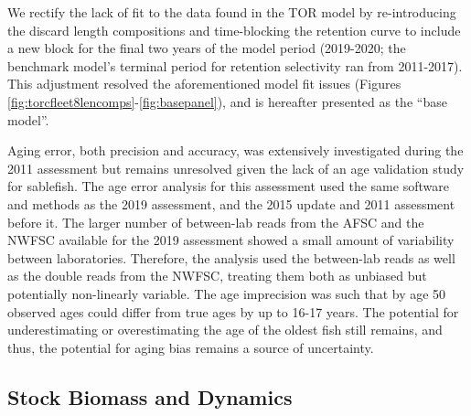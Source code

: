 \documentclass[11pt,
  english,
  a4paper,
]{article}
\begin{document}
\leavevmode\tagmcend\tagstructend\par


We rectify the lack of fit to the data found in the TOR model by re-introducing the discard length compositions and time-blocking the retention curve to include a new block for the final two years of the model period (2019-2020; the benchmark model's terminal period for retention selectivity ran from 2011-2017). This adjustment resolved the aforementioned model fit issues (Figures \ref{fig:torcfleet8lencomps}-\ref{fig:basepanel}), and is hereafter presented as the ``base model''.

\leavevmode\tagmcend\tagstructend\par


Aging error, both precision and accuracy, was extensively investigated during the 2011 assessment but remains unresolved given the lack of an age validation study for sablefish. The age error analysis for this assessment used the same software and methods as the 2019 assessment, and the 2015 update and 2011 assessment before it. The larger number of between-lab reads from the AFSC and the NWFSC available for the 2019 assessment showed a small amount of variability between laboratories. Therefore, the analysis used the between-lab reads as well as the double reads from the NWFSC, treating them both as unbiased but potentially non-linearly variable. The age imprecision was such that by age 50 observed ages could differ from true ages by up to 16-17 years. The potential for underestimating or overestimating the age of the oldest fish still remains, and thus, the potential for aging bias remains a source of uncertainty.

\leavevmode\tagmcend\tagstructend\par


\hypertarget{stock-biomass-and-dynamics}{%
\subsection*{Stock Biomass and Dynamics}\label{stock-biomass-and-dynamics}}

\leavevmode\tagmcend\tagstructend

\end{document}
